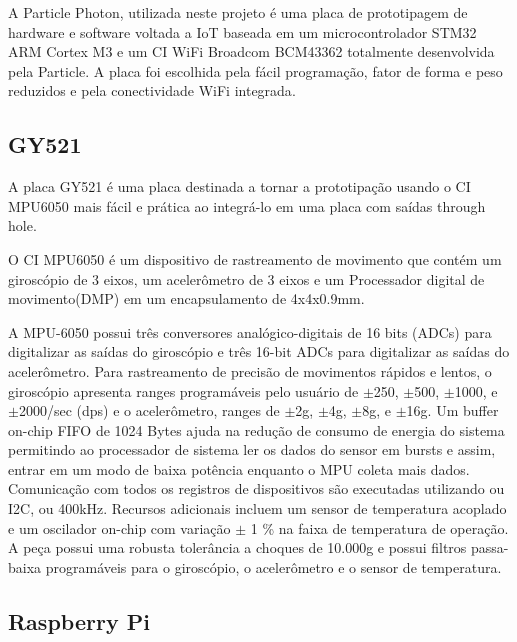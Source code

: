 	A Particle Photon, utilizada neste projeto é uma placa de prototipagem de hardware e software voltada a IoT baseada em um microcontrolador STM32 ARM Cortex M3 e um CI WiFi Broadcom BCM43362 totalmente desenvolvida pela Particle. A placa foi escolhida pela fácil programação, fator de forma e peso reduzidos e pela conectividade WiFi integrada\cite{Particle}. \par

		
	
	
	\subsection{GY521}\label{subsec-GY521}

	

	A placa GY521 é uma placa destinada a tornar a prototipação usando o CI MPU6050 mais fácil e prática ao integrá-lo em uma placa com saídas through hole.
	
	O CI MPU6050 é um dispositivo de rastreamento de movimento que contém um giroscópio de 3 eixos, um acelerômetro de 3 eixos e um Processador digital de movimento(DMP) em um encapsulamento de 4x4x0.9mm.
	 
	A MPU-6050 possui três conversores analógico-digitais de 16 bits (ADCs) para digitalizar as saídas do giroscópio e três 16-bit ADCs para digitalizar as saídas do acelerômetro. Para rastreamento de precisão de movimentos rápidos e lentos,  o giroscópio apresenta ranges programáveis pelo usuário de $\pm$250, $\pm$500, $\pm$1000, e $\pm$2000\degree/sec (dps) e o acelerômetro, ranges de $\pm$2g, $\pm$4g, $\pm$8g, e $\pm$16g. Um buffer on-chip FIFO de 1024 Bytes ajuda na redução de consumo de energia do sistema permitindo ao processador de sistema ler os dados do sensor em bursts e assim, entrar em um modo de baixa potência enquanto o MPU coleta mais dados.
	Comunicação com todos os registros de dispositivos são executadas utilizando ou I2C, ou 400kHz. Recursos adicionais incluem um sensor de temperatura acoplado e um oscilador on-chip com variação $\pm$ 1 \% na faixa de temperatura de operação. A peça possui uma robusta tolerância a choques de 10.000g e possui filtros passa-baixa programáveis para o giroscópio, o acelerômetro e o sensor de temperatura\cite{mpu6050}.
	

	
	\subsection{Raspberry Pi}\label{subsec-rasp}
	
